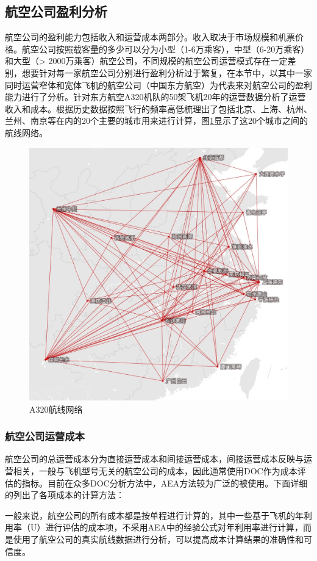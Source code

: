 \documentclass[12pt,a4paper]{report}
\begin{document}
\subsection{航空公司盈利分析}
航空公司的盈利能力包括收入和运营成本两部分。收入取决于市场规模和机票价格。航空公司按照载客量的多少可以分为小型（1-6万乘客），中型（6-20万乘客）和大型（> 2000万乘客）航空公司，不同规模的航空公司运营模式存在一定差别，想要针对每一家航空公司分别进行盈利分析过于繁复，在本节中，以其中一家同时运营窄体和宽体飞机的航空公司（中国东方航空）为代表来对航空公司的盈利能力进行了分析。针对东方航空A320机队的50架飞机20年的运营数据分析了运营收入和成本。根据历史数据按照飞行的频率高低梳理出了包括北京、上海、杭州、兰州、南京等在内的20个主要的城市用来进行计算，图\ref{fig:320route}显示了这20个城市之间的航线网络。
\begin{figure}[!htp]
  \centering
  \includegraphics[width=.8\textwidth]{eps/a320route.jpg}
  \caption{A320航线网络}
 \label{fig:320route}
\end{figure}

\subsubsection{航空公司运营成本}

航空公司的总运营成本分为直接运营成本和间接运营成本，间接运营成本反映与运营相关，一般与飞机型号无关的航空公司的成本，因此通常使用DOC作为成本评估的指标。目前在众多DOC分析方法中，AEA方法\cite{AEA1989short}较为广泛的被使用。下面详细的列出了各项成本的计算方法：


一般来说，航空公司的所有成本都是按单程进行计算的，其中一些基于飞机的年利用率（U）进行评估的成本项，不采用AEA中的经验公式对年利用率进行计算，而是使用了航空公司的真实航线数据进行分析，可以提高成本计算结果的准确性和可信度。
\end{document}
